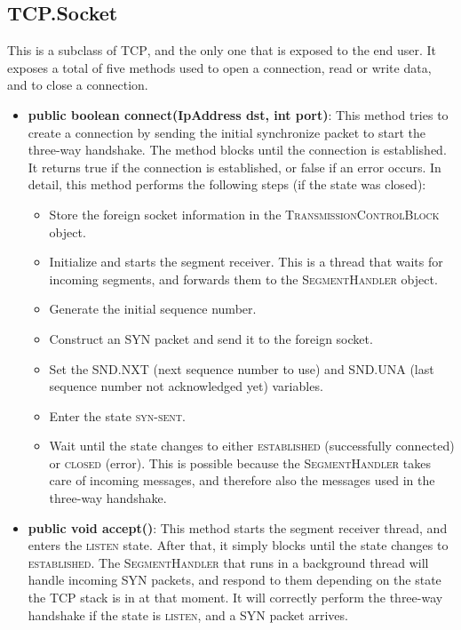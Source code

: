 \documentclass{hitec}
\newcommand{\classname}[1]{\textsc{#1}}
\newcommand{\state}[1]{\textsc{#1}}
\begin{document}
\begin{itemize}
\end{itemize}

\subsection{TCP.Socket}
This is a subclass of \classname{TCP}, and the only one that is exposed to the end user. It exposes a total of five methods used to open a connection, read or write data, and to close a connection.

\begin{itemize}
 \item \textbf{public boolean connect(IpAddress dst, int port)}: This method tries to create a connection by sending the initial synchronize packet to start the three-way handshake. The method blocks until the connection is established. It returns true if the connection is established, or false if an error occurs. In detail, this method performs the following steps (if the state was closed):
 
  \begin{itemize}
    \item Store the foreign socket information in the \classname{TransmissionControlBlock} object.
    \item Initialize and starts the segment receiver. This is a thread that waits for incoming segments, and forwards them to the \classname{SegmentHandler} object.
    \item Generate the initial sequence number.
    \item Construct an SYN packet and send it to the foreign socket.
    \item Set the SND.NXT (next sequence number to use) and SND.UNA (last sequence number not acknowledged yet) variables.
    \item Enter the state \state{syn-sent}.
    \item Wait until the state changes to either \state{established} (successfully connected) or \state{closed} (error). This is possible because the \classname{SegmentHandler} takes care of incoming messages, and therefore also the messages used in the three-way handshake.
  \end{itemize}

   \item \textbf{public void accept()}: This method starts the segment receiver thread, and enters the \state{listen} state. After that, it simply blocks until the state changes to \state{established}. The \classname{SegmentHandler} that runs in a background thread will handle incoming SYN packets, and respond to them depending on the state the TCP stack is in at that moment. It will correctly perform the three-way handshake if the state is \state{listen}, and a SYN packet arrives.
   

\end{itemize}
\end{document}
